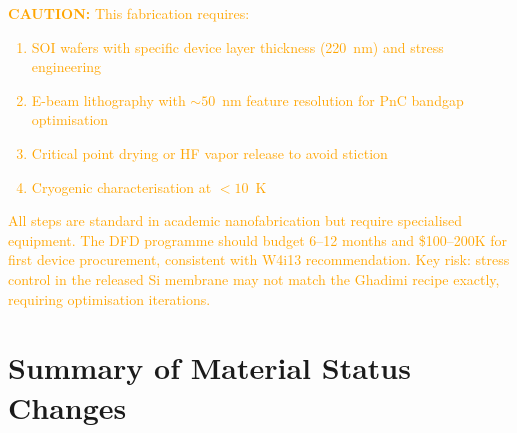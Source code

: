 \documentclass[11pt]{article}
\theoremstyle{definition}
\theoremstyle{remark}
\newcommand{\caution}[1]{\textcolor{orange}{\textbf{CAUTION:} #1}}
\begin{document}
\caution{This fabrication requires:
\begin{enumerate}[nosep]
\item SOI wafers with specific device layer thickness (220~nm) and
  stress engineering
\item E-beam lithography with $\sim 50$~nm feature resolution for
  PnC bandgap optimisation
\item Critical point drying or HF vapor release to avoid stiction
\item Cryogenic characterisation at $< 10$~K
\end{enumerate}
All steps are standard in academic nanofabrication but require
specialised equipment. The DFD programme should budget 6--12 months
and \$100--200K for first device procurement, consistent with W4i13
recommendation. Key risk: stress control in the released Si membrane
may not match the Ghadimi recipe exactly, requiring optimisation
iterations.}


\section{Summary of Material Status Changes}
\label{sec:changes}
\end{document}
